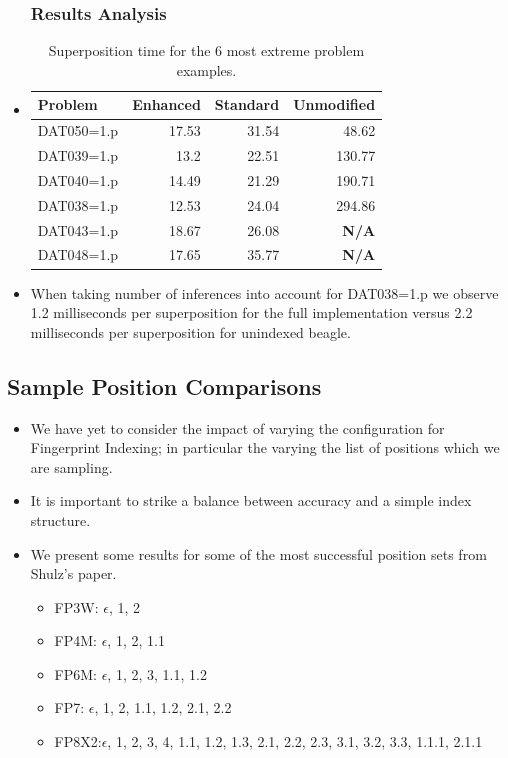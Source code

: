 \documentclass[10pt,xcolor={dvipsnames}]{beamer}
\begin{document}
\begin{NoHyper}
\begin{frame}
  \begin{itemize}
  \frametitle{Results Analysis}
  \item<1->[]
 \begin{table}[H]\scriptsize
  \caption{Superposition time for the 6 most extreme problem examples.}
\begin{tabular}{| l || r | r | r |}  \hline
Problem&Enhanced&Standard&Unmodified\\  \hline
DAT050=1.p&17.53& 31.54& 48.62\\
DAT039=1.p&13.2& 22.51& 130.77\\
DAT040=1.p&14.49& 21.29& 190.71\\
DAT038=1.p&12.53& 24.04& 294.86\\
DAT043=1.p&18.67& 26.08& \textbf{N/A} \\
DAT048=1.p&17.65& 35.77& \textbf{N/A}\\\hline
\end{tabular}\end{table}
  \item<2-> When taking number of inferences into account for DAT038=1.p we observe
  1.2 milliseconds per superposition for the full implementation versus 2.2 milliseconds
  per superposition for unindexed beagle.
  \end{itemize}
\end{frame}

\subsection{Sample Position Comparisons}
\begin{frame}
  \begin{itemize}
  \frametitle{Fingerprint Sampling Varieties}
  \item<1-> We have yet to consider the impact of varying the configuration for 
  Fingerprint Indexing; in particular the varying the list of positions which we are sampling.
  \item<2-> It is important to strike a balance between accuracy and a simple index structure.
  \item<3-> We present some results for some of the most successful position sets from
  Shulz's paper.
  \begin{itemize}
  \item FP3W: $\epsilon$, 1, 2
  \item FP4M: $\epsilon$, 1, 2, 1.1
  \item FP6M: $\epsilon$, 1, 2, 3, 1.1, 1.2
  \item FP7:  $\epsilon$, 1, 2, 1.1, 1.2, 2.1, 2.2
  \item FP8X2:$\epsilon$, 1, 2, 3, 4, 1.1, 1.2, 1.3, 2.1, 2.2, 2.3, 3.1, 3.2, 3.3, 1.1.1, 2.1.1
  \end{itemize}
  \end{itemize}
\end{frame}


\end{NoHyper}
\end{document}
